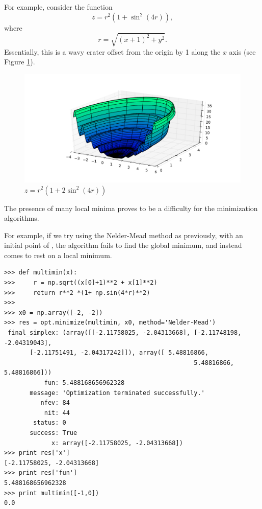 For example, consider the function
\[
z = r^2 (1+ \sin^2(4r)),
\]
where
\[
r = \sqrt{(x+1)^2 + y^2}.
\]
Essentially, this is a wavy crater offset from the origin by 1 along the $x$ axis (see Figure \ref{opt:multimin}).
\begin{figure}
\includegraphics[width=\textwidth]{ManyMinima.pdf}
\caption{$z = r^2 (1+ 2\sin^2(4r))$}
\label{opt:multimin}
\end{figure}
The presence of many local minima proves to be a difficulty for the minimization algorithms.

For example, if we try using the Nelder-Mead method as previously, with an initial point of , the algorithm fails to find the global minimum, and instead comes to rest on a local minimum.
\begin{lstlisting}
>>> def multimin(x):
>>>     r = np.sqrt((x[0]+1)**2 + x[1]**2)
>>>     return r**2 *(1+ np.sin(4*r)**2)
>>>
>>> x0 = np.array([-2, -2])
>>> res = opt.minimize(multimin, x0, method='Nelder-Mead')
 final_simplex: (array([[-2.11758025, -2.04313668], [-2.11748198, -2.04319043],
       [-2.11751491, -2.04317242]]), array([ 5.48816866,  
       												5.48816866,  5.48816866]))
           fun: 5.488168656962328
       message: 'Optimization terminated successfully.'
          nfev: 84
           nit: 44
        status: 0
       success: True
             x: array([-2.11758025, -2.04313668])
>>> print res['x']
[-2.11758025, -2.04313668]
>>> print res['fun']
5.488168656962328
>>> print multimin([-1,0])
0.0
\end{lstlisting}


